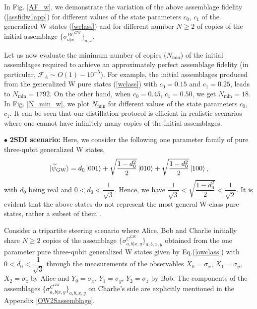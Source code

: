 \documentclass[reprint,superscriptaddress,nofootinbib,amsmath,amssymb,aps,pra,longbibliography]{revtex4-1}
\begin{document}
In Fig. \ref{AF_w}, we  demonstrate the variation of the above assemblage fidelity (\ref{assfidw1app}) for different values of the state parameters $c_0$, $c_1$ of the  generalized W states (\ref{wclass}) and for different number $N \geq 2$ of copies of the initial assemblage  $\{\sigma_{a|x}^{BC^{\text{GW}}}\}_{a,x}$.



Let us now evaluate the  minimum number of copies ($N_{\text{min}}$) of the initial assemblages required to achieve an approximately perfect assemblage fidelity  (in particular, $\mathcal{F}_{A} \sim O(1) - 10^{-5}$).   
For example, the initial assemblages produced from the generalized W pure states (\ref{wclass}) with  $c_0 = 0.15$ and $c_1 = 0.25$, leads to $N_{\text{min}} = 1792$. On the other hand, when  $c_0 = 0.45$, $c_1 = 0.50$, we get $N_{\text{min}} = 18$.
In Fig. \ref{N_min_w}, we  plot $N_{\text{min}}$ for different values of the state parameters $c_0$, $c_1$.
 It can be seen that our distillation protocol is efficient  in realistic scenarios where one cannot have infinitely many copies of the initial assemblages.



\vspace{1cm}

$\bullet$ {\bf 2SDI scenario:} Here, we consider the following one parameter family of pure three-qubit  generalized W states, 
\begin{equation}
	\ket{\widetilde{\psi}_{\text{GW}}} = d_0 \ket{001} + \sqrt{\frac{1-d_0^2}{2}} \ket{010} + \sqrt{\frac{1-d_0^2}{2}} \ket{100},
	\label{owclass}
\end{equation}
with $d_0$ being real and $0<d_0<\dfrac{1}{\sqrt{3}}$. Hence, we have $\dfrac{1}{\sqrt{3}} < \sqrt{\dfrac{1-d_0^2}{2}} < \dfrac{1}{\sqrt{2}}$.  It is evident that the above states do not represent the most general W-class pure states, rather a subset of them \cite{ALS1}.

Consider a tripartite steering scenario where Alice, Bob and Charlie  initially share $N \geq 2$ copies of the assemblage $\{\sigma_{a,b|x,y}^{C^{\text{GW}}}\}_{a,b,x,y}$ obtained from the one parameter pure three-qubit generalized W states given by Eq.(\ref{owclass}) with $0 < d_0 < \dfrac{1}{\sqrt{3}}$ through the measurements of the observables $X_0=\sigma_x$, $X_1=\sigma_y$, $X_2=\sigma_z$ by Alice and $Y_0=\sigma_x$, $Y_1=\sigma_y$, $Y_2=\sigma_z$ by Bob. The components of the assemblages $\{\sigma_{a,b|x,y}^{C^{\text{GW}}} \}_{a,b,x,y}$ on Charlie's side are  explicitly mentioned in the Appendix \ref{OW2Sassemblage}.
\end{document}
